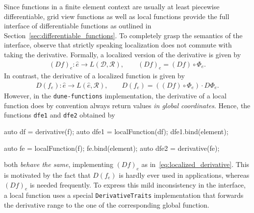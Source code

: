 \documentclass[11pt,
                 numbers=noenddot,
                 headings=normal,
                 DIV16, BCOR10mm]{scrartcl}
\newcommand{\cpp}{\lstinline}
\theoremstyle{remark}
\newcommand{\dunemodule}[1]{\texttt{#1}}
\begin{document}
Since functions in a finite element context are usually at least piecewise
differentiable, grid view functions as well as local functions provide the full
interface of differentiable functions as outlined in Section~\ref{sec:differentiable_functions}.
To completely grasp the semantics of the interface, observe that strictly speaking localization does
not commute with taking the derivative. Formally, a localized version of the derivative is given by
\begin{align}
\label{eq:localized_derivative}
    (Df)_e : \hat{e} \to L(\mathcal{D}, \mathcal{R}), \qquad (Df)_e = (Df) \circ \Phi_e.
\end{align}
In contrast, the derivative of a localized function is given by
\begin{align*}
    D(f_e) : \hat{e} \to L(\hat{e}, \mathcal{R}), \qquad D(f_e) = ((Df) \circ \Phi_e) \cdot D \Phi_e.
\end{align*}
However, in the \dunemodule{dune-functions} implementation, the derivative of a local function
does by convention always return values {\em in global coordinates}. Hence, the functions
\cpp{dfe1} and \cpp{dfe2} obtained by
\begin{c++}
auto df = derivative(f);
auto dfe1 = localFunction(df);
dfe1.bind(element);

auto fe = localFunction(f);
fe.bind(element);
auto dfe2 = derivative(fe);
\end{c++}
both {\em behave the same}, implementing $(Df)_e$ as in~\eqref{eq:localized_derivative}.
This is motivated by the fact that $D(f_e)$ is
hardly ever used in applications, whereas $(Df)_e$ is needed
frequently. To express this mild inconsistency in the interface,
a local function uses a special \cpp{DerivativeTraits} implementation
that forwards the derivative range to the one of the corresponding
global function.
\end{document}
